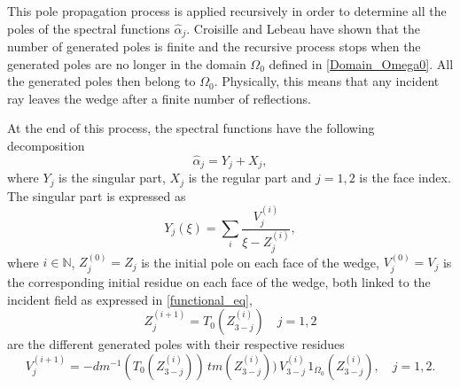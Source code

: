This pole propagation process is applied recursively in order to determine all the poles of the spectral functions $\hat{\alpha}_j$. Croisille and Lebeau \cite{CroisilleLebeau} have shown that the number of generated poles is finite and the recursive process stops when the generated poles are no longer in the domain $\Omega_0$ defined in \eqref{Domain_Omega0}. All the generated poles then belong to $\Omega_0$. Physically, this means that any incident ray leaves the wedge after a finite number of reflections.

At the end of this process, the spectral functions have the following decomposition
\begin{equation}
\label{spec_decomp}
\hat{\alpha}_j=Y_j+X_j, 
\end{equation}
where  $Y_j$ is the singular part, $X_j$ is the regular part  and $j=1,2$ is the face index. The singular part is expressed as
\begin{equation}
\label{sing_part}
 Y_j(\xi) = \sum_i \dfrac{{V_j^{(i)}}}{{\xi - Z_j^{(i)}}},
\end{equation}
where $i \in \mathbb{N}$, $Z_j^{(0)} = Z_j$ is the initial pole on each face of the wedge, $V_j^{(0)}=V_j$ is the corresponding initial residue on each face of the wedge, both linked to the incident field as expressed in \eqref{functional_eq},
\begin{equation}
\label{Generated_poles}
Z_j^{(i+1)} = T_0(Z_{3-j}^{(i)}) \quad j=1,2
\end{equation} 
are the different generated poles with their respective residues 
\begin{equation}
\label{Generated_residues}
V_j^{(i+1)}=-dm^{-1}(T_0(Z_{3-j}^{(i)})) \,  tm(Z_{3-j}^{(i)})) \, V_{3-j}^{(i)} \, 1_{\Omega_0}(Z_{3-j}^{(i)}), \quad  j=1,2.
\end{equation}
